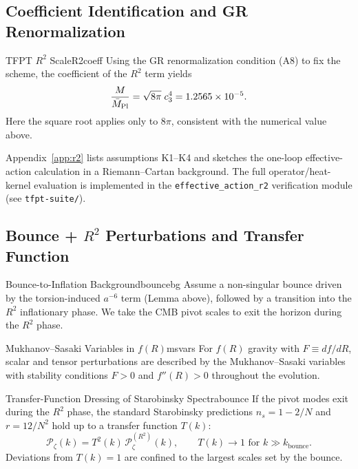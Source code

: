 \subsection{Coefficient Identification and GR Renormalization}

\begin{theorem}{TFPT $R^2$ Scale}{R2coeff}
Using the GR renormalization condition (A8) to fix the scheme, the coefficient of the
$R^2$ term yields
\begin{equation}
    \frac{M}{\bar{M}_{\mathrm{Pl}}}=\sqrt{8\pi}\;c_3^4
    = 1.2565\times 10^{-5}.
    \label{eq:R2scale}
\end{equation}
Here the square root applies only to $8\pi$, consistent with the numerical value above.
\end{theorem}

\begin{tcolorbox}[colback=green!3, colframe=green!50!black, 
    title={\textbf{Derivation Provided (Conditional)}}, fonttitle=\bfseries\small]
Appendix~\ref{app:r2} lists assumptions K1--K4 and sketches the one-loop effective-action
calculation in a Riemann--Cartan background. The full operator/heat-kernel evaluation is
implemented in the \texttt{effective\_action\_r2} verification module (see \texttt{tfpt-suite/}).
\end{tcolorbox}

\subsection{\texorpdfstring{Bounce + $R^2$ Perturbations and Transfer Function}{Bounce + R2 Perturbations and Transfer Function}}
\label{sec:bounce}

\begin{definition}{Bounce-to-Inflation Background}{bouncebg}
Assume a non-singular bounce driven by the torsion-induced $a^{-6}$ term
(Lemma above), followed by a transition into the $R^2$ inflationary phase.
We take the CMB pivot scales to exit the horizon during the $R^2$ phase.
\end{definition}

\begin{definition}{Mukhanov--Sasaki Variables in $f(R)$}{msvars}
For $f(R)$ gravity with $F \equiv df/dR$, scalar and tensor perturbations are
described by the Mukhanov--Sasaki variables with stability conditions
$F>0$ and $f''(R)>0$ throughout the evolution.
\end{definition}

\begin{theorem}{Transfer-Function Dressing of Starobinsky Spectra}{bounce}
If the pivot modes exit during the $R^2$ phase, the standard Starobinsky
predictions
$n_s = 1 - 2/N$ and $r = 12/N^2$ hold up to a transfer function $T(k)$:
\begin{equation}
    \mathcal{P}_\zeta(k) = T^2(k)\,\mathcal{P}_\zeta^{(R^2)}(k),
    \qquad T(k)\to 1 \text{ for } k \gg k_{\text{bounce}}.
\end{equation}
Deviations from $T(k)=1$ are confined to the largest scales set by the bounce.
\end{theorem}

